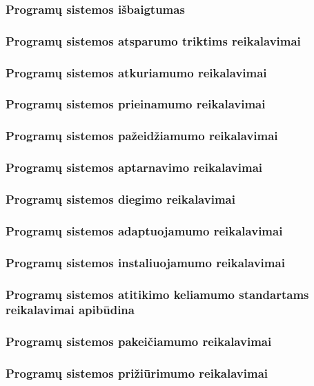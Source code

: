 \documentclass{VUMIFPSkursinis}
\begin{document}
	\subsubsection{Programų sistemos išbaigtumas}
	\subsubsection{Programų sistemos atsparumo triktims reikalavimai}
	\subsubsection{Programų sistemos atkuriamumo reikalavimai}
	\subsubsection{Programų sistemos prieinamumo reikalavimai}
	\subsubsection{Programų sistemos pažeidžiamumo reikalavimai}
	\subsubsection{Programų sistemos aptarnavimo reikalavimai}
	\subsubsection{Programų sistemos diegimo reikalavimai}
	\subsubsection{Programų sistemos adaptuojamumo reikalavimai}
	\subsubsection{Programų sistemos instaliuojamumo reikalavimai}
	\subsubsection{Programų sistemos atitikimo keliamumo standartams reikalavimai apibūdina}
	\subsubsection{Programų sistemos pakeičiamumo reikalavimai}
	\subsubsection{Programų sistemos prižiūrimumo reikalavimai}
\end{document}
